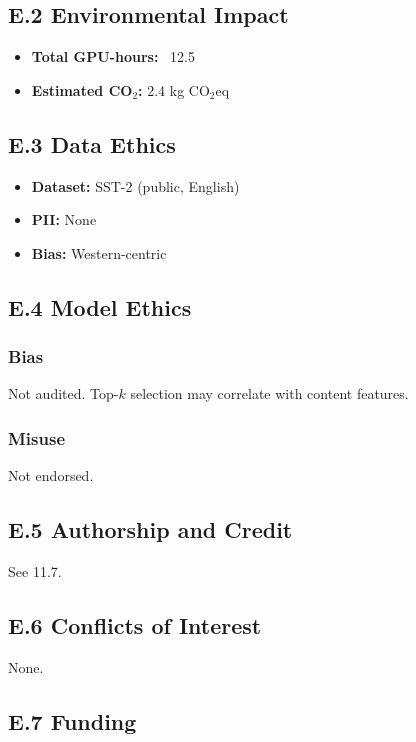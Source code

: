 \subsection{E.2 Environmental Impact}

\begin{itemize}
\item \textbf{Total GPU-hours:} ~12.5
\item \textbf{Estimated CO$_2$:} 2.4 kg CO$_2$eq

\end{itemize}
\subsection{E.3 Data Ethics}

\begin{itemize}
\item \textbf{Dataset:} SST-2 (public, English)
\item \textbf{PII:} None
\item \textbf{Bias:} Western-centric

\end{itemize}
\subsection{E.4 Model Ethics}

\subsubsection{Bias}
Not audited. Top-$k$ selection may correlate with content features.

\subsubsection{Misuse}
Not endorsed.

\subsection{E.5 Authorship and Credit}

See  11.7.

\subsection{E.6 Conflicts of Interest}

None.

\subsection{E.7 Funding}

